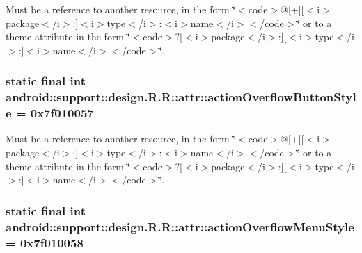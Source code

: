 Must be a reference to another resource, in the form \char`\"{}$<$code$>$@\mbox{[}+\mbox{]}\mbox{[}$<$i$>$package$<$/i$>$:\mbox{]}$<$i$>$type$<$/i$>$:$<$i$>$name$<$/i$>$$<$/code$>$\char`\"{} or to a theme attribute in the form \char`\"{}$<$code$>$?\mbox{[}$<$i$>$package$<$/i$>$:\mbox{]}\mbox{[}$<$i$>$type$<$/i$>$:\mbox{]}$<$i$>$name$<$/i$>$$<$/code$>$\char`\"{}. \hypertarget{classandroid_1_1support_1_1design_1_1_r_1_1attr_2981f5856a8b7ce452e8b4c944b9afe8}{
\subsubsection[{actionOverflowButtonStyle}]{\setlength{\rightskip}{0pt plus 5cm}static final int android::support::design.R.R::attr::actionOverflowButtonStyle = 0x7f010057}}
\label{classandroid_1_1support_1_1design_1_1_r_1_1attr_2981f5856a8b7ce452e8b4c944b9afe8}


Must be a reference to another resource, in the form \char`\"{}$<$code$>$@\mbox{[}+\mbox{]}\mbox{[}$<$i$>$package$<$/i$>$:\mbox{]}$<$i$>$type$<$/i$>$:$<$i$>$name$<$/i$>$$<$/code$>$\char`\"{} or to a theme attribute in the form \char`\"{}$<$code$>$?\mbox{[}$<$i$>$package$<$/i$>$:\mbox{]}\mbox{[}$<$i$>$type$<$/i$>$:\mbox{]}$<$i$>$name$<$/i$>$$<$/code$>$\char`\"{}. \hypertarget{classandroid_1_1support_1_1design_1_1_r_1_1attr_3b2e5bf0a596c0111389f1a9a1873e69}{
\subsubsection[{actionOverflowMenuStyle}]{\setlength{\rightskip}{0pt plus 5cm}static final int android::support::design.R.R::attr::actionOverflowMenuStyle = 0x7f010058}}
\label{classandroid_1_1support_1_1design_1_1_r_1_1attr_3b2e5bf0a596c0111389f1a9a1873e69}


